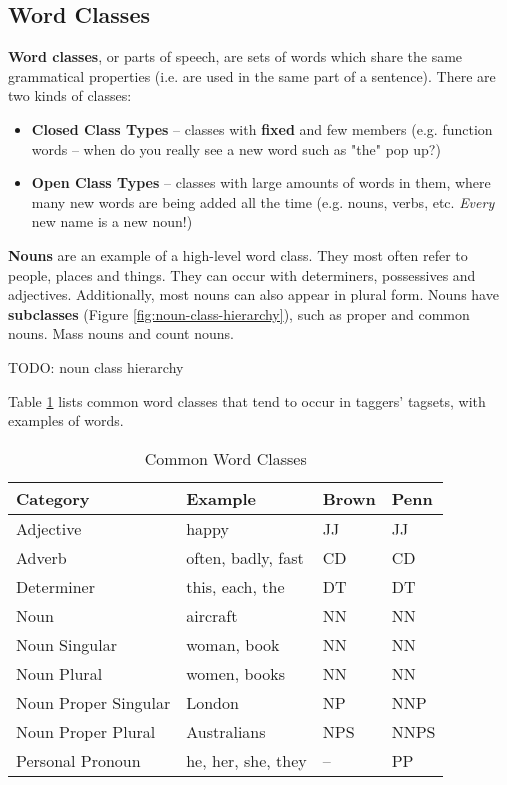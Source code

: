 \documentclass{article}
\begin{document}
\subsection{Word Classes}

\textbf{Word classes}, or parts of speech, are sets of words which share the same grammatical properties (i.e. are used in the same part of a sentence). There are two kinds of classes:
\begin{itemize}
	\item \textbf{Closed Class Types} -- classes with \textbf{fixed} and few members (e.g. function words -- when do you really see a new word such as "the" pop up?)
	\item \textbf{Open Class Types} -- classes with large amounts of words in them, where many new words are being added all the time (e.g. nouns, verbs, etc. \textit{Every} new name is a new noun!)
\end{itemize}

\textbf{Nouns} are an example of a high-level word class. They most often refer to people, places and things. They can occur with determiners, possessives and adjectives. Additionally, most nouns can also appear in plural form. Nouns have \textbf{subclasses} (Figure \ref{fig:noun-class-hierarchy}), such as proper and common nouns. Mass nouns and count nouns.

TODO: noun class hierarchy

Table \ref{tab:common-word-classes} lists common word classes that tend to occur in taggers' tagsets, with examples of words.

\begin{table}
	\centering
	\begin{tabular}{|l|l|l|l|}
		\hline
		\textbf{Category} & \textbf{Example} & \textbf{Brown} & \textbf{Penn} \\
		\hline
		Adjective & happy & JJ & JJ \\
		Adverb & often, badly, fast & CD & CD \\
		Determiner & this, each, the & DT & DT \\
		Noun & aircraft & NN & NN \\
		Noun Singular & woman, book & NN & NN \\
		Noun Plural & women, books & NN & NN \\
		Noun Proper Singular & London & NP & NNP \\
		Noun Proper Plural & Australians & NPS & NNPS \\
		Personal Pronoun & he, her, she, they & -- & PP \\
		\hline 
	\end{tabular}
	\caption{Common Word Classes}
	\label{tab:common-word-classes} 
\end{table}
\end{document}
